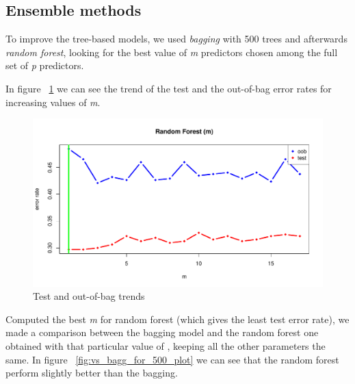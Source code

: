 \subsection{Ensemble methods}

To improve the tree-based models, we used \textit{bagging} with 500 trees and afterwards \textit{random forest}, looking for the best value of \textit{m} predictors chosen among the full set of \textit{p} predictors. 

In figure \Fig~\ref{fig:m_best_for_500_plot} we can see the trend of the test and the out-of-bag error rates for increasing values of \textit{m}.

\begin{figure}[h]
	\centering
	\includegraphics[width=0.5\linewidth]{ImageFiles/Classification/Trees/m_best_for_500_plot}
	\caption{Test and out-of-bag trends}
	\label{fig:m_best_for_500_plot}
\end{figure}

Computed the best \textit{m} for random forest (which gives the least test error rate), we made a comparison between the bagging model and the random forest one obtained with that particular value of , keeping all the other parameters the same.
In figure \Fig~\ref{fig:vs_bagg_for_500_plot} we can see that the random forest perform slightly better than the bagging.

